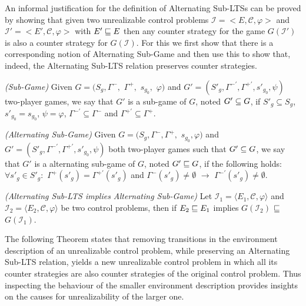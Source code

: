 An informal justification for the definition of Alternating Sub-LTSs can be proved by showing that  given two unrealizable control problems $\mathcal{I} = <E, \mathcal{C}, \varphi>$ and $\mathcal{I'} = <E', \mathcal{C}, \varphi>$ with $E' \sqsubseteq E$ then any counter strategy for the game $G(\mathcal{I'})$ is also a counter strategy for $G(\mathcal{I})$. For this we first show that there is a corresponding notion of Alternating Sub-Game and then use this to show that, indeed, the Alternating Sub-LTS relation preserves counter strategies.  


\begin{definition}\label{def:sub-game}\emph{(Sub-Game)}
Given $G = (S_g, \Gamma^{-},$ $\Gamma^{+},$ $s_{g_{0}}$$,$ $\varphi)$ and
$G' = (S'_g, \Gamma^{-\prime}, \Gamma^{+\prime},s'_{g_{0}}, \psi)$ two-player games, we say that $G'$ is a sub-game of $G$, noted
$G' \subseteq G$, if $S'_g \subseteq S_g$, $s'_{g_{0}}=s_{g_{0}}$, $\psi = \varphi$, $\Gamma^{-\prime}\subseteq \Gamma^{-}$ and
$\Gamma^{+\prime}\subseteq \Gamma^{+}$.
\end{definition}

\begin{definition}\label{def:alternating-sub-game}\emph{(Alternating Sub-Game)}
Given $G = (S_g, \Gamma^{-}, \Gamma^{+},$ $s_{g_{0}}, \varphi)$ and
$G' = (S'_g, \Gamma^{-\prime}, \Gamma^{+\prime},s'_{g_{0}}, \psi)$ both two-player games such that $G' \subseteq G$, we say that $G'$ is a alternating sub-game of $G$, noted
$G'\sqsubseteq G$, if the following holds: $\forall s'_g \in S'_g:$ 
$\Gamma^{+}(s'_g)=\Gamma^{+\prime}(s'_g)$ and $\Gamma^{-}(s'_g)\neq \emptyset$ $\rightarrow$ $\Gamma^{-\prime}(s'_g) \neq \emptyset$. 
\end{definition}

\begin{lemma}\emph{(Alternating Sub-LTS implies Alternating Sub-Game)}\label{theorem:alternating-sub-game}
Let $\mathcal{I}_1 = \langle E_1, \mathcal{C}, \varphi \rangle$ and
$\mathcal{I}_2 = \langle E_2, \mathcal{C}, \varphi \rangle$ be two
control problems, then if $E_2 \sqsubseteq E_1$ implies $G(\mathcal{I}_2)$
$\sqsubseteq$ $G(\mathcal{I}_1)$.
\end{lemma}

%

The following Theorem states that removing transitions in the environment description of an unrealizable control problem, while preserving an Alternating Sub-LTS relation, yields a new unrealizable control problem in which all its counter strategies are also counter strategies of the original control problem. Thus inspecting the behaviour of the smaller environment description provides insights on the causes for unrealizability of the larger one.  

